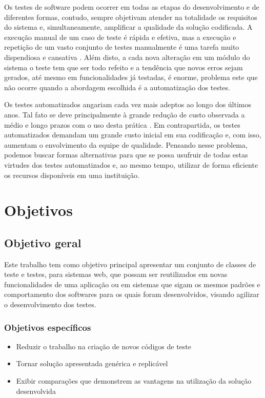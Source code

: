 \documentclass[tg]{mdtufsm}
\begin{document}
Os testes de software podem ocorrer em todas as etapas do desenvolvimento e de diferentes formas, contudo,
sempre objetivam atender na totalidade os requisitos do sistema e, simultaneamente, amplificar a qualidade da solução codificada. A execução manual de um caso de teste é rápida e efetiva, mas a execução e repetição de um vasto conjunto de testes manualmente é uma tarefa muito dispendiosa e cansativa  \cite{bernardo2008importancia}.
Além disto, a cada nova alteração em um módulo do sistema o teste tem que ser todo refeito e a tendência que novos erros sejam gerados, até mesmo em funcionalidades já testadas, é enorme,
problema este que não ocorre quando a abordagem escolhida é a automatização dos testes. 

Os testes automatizados angariam cada vez mais adeptos ao longo dos últimos anos. Tal fato se deve principalmente à grande redução de custo observada a médio e longo prazos com o uso desta prática \cite{de2007utilizaccao}. Em contrapartida, os testes automatizados demandam um grande custo inicial em sua codificação e, com isso, aumentam o
envolvimento da equipe de qualidade. Pensando nesse problema, podemos buscar formas alternativas para que se possa usufruir de todas estas virtudes dos testes automatizados e, ao mesmo tempo, utilizar de forma eficiente os recursos disponíveis em uma instituição.

\section{Objetivos}

\subsection{Objetivo geral}

Este trabalho tem como objetivo principal apresentar um conjunto de classes de teste e testes, para sistemas web, que possam ser reutilizados em novas funcionalidades de uma aplicação ou em sistemas que sigam os mesmos padrões e comportamento dos softwares para os quais foram desenvolvidos, visando agilizar o desenvolvimento dos testes.

\subsubsection{Objetivos específicos}

\begin{itemize}
	\item Reduzir o trabalho na criação de novos códigos de teste
	\item Tornar solução apresentada genérica e replicável
	\item Exibir comparações que demonstrem as vantagens na utilização da solução desenvolvida
\end{itemize}
\end{document}

